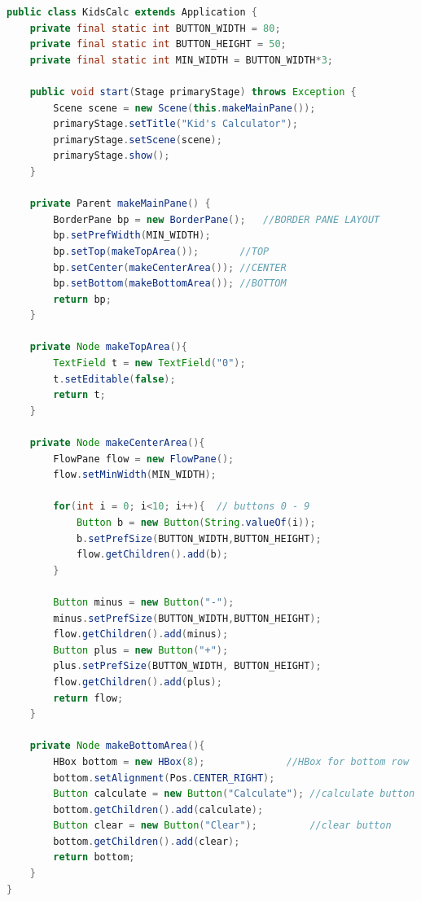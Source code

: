 \vspace{-60pt}
\begin{answer}
\begin{lstlisting}[language=java,basicstyle=\scriptsize]
public class KidsCalc extends Application {
    private final static int BUTTON_WIDTH = 80;
    private final static int BUTTON_HEIGHT = 50;
    private final static int MIN_WIDTH = BUTTON_WIDTH*3;

    public void start(Stage primaryStage) throws Exception {
        Scene scene = new Scene(this.makeMainPane());
        primaryStage.setTitle("Kid's Calculator");
        primaryStage.setScene(scene);
        primaryStage.show();
    }

    private Parent makeMainPane() {
        BorderPane bp = new BorderPane();	//BORDER PANE LAYOUT
        bp.setPrefWidth(MIN_WIDTH);
        bp.setTop(makeTopArea()); 		//TOP
        bp.setCenter(makeCenterArea());	//CENTER
        bp.setBottom(makeBottomArea());	//BOTTOM
        return bp;
    }

    private Node makeTopArea(){
        TextField t = new TextField("0");
        t.setEditable(false);
        return t;
    }

    private Node makeCenterArea(){
        FlowPane flow = new FlowPane();
        flow.setMinWidth(MIN_WIDTH);
        
        for(int i = 0; i<10; i++){	// buttons 0 - 9
            Button b = new Button(String.valueOf(i));
            b.setPrefSize(BUTTON_WIDTH,BUTTON_HEIGHT);
            flow.getChildren().add(b);
        }
        
        Button minus = new Button("-"); 
        minus.setPrefSize(BUTTON_WIDTH,BUTTON_HEIGHT);
        flow.getChildren().add(minus);
        Button plus = new Button("+");
        plus.setPrefSize(BUTTON_WIDTH, BUTTON_HEIGHT);
        flow.getChildren().add(plus);
        return flow;
    }

    private Node makeBottomArea(){
        HBox bottom = new HBox(8);				//HBox for bottom row
        bottom.setAlignment(Pos.CENTER_RIGHT);
        Button calculate = new Button("Calculate");	//calculate button
        bottom.getChildren().add(calculate);
        Button clear = new Button("Clear");			//clear button
        bottom.getChildren().add(clear);
        return bottom;
    }
}
\end{lstlisting}
\end{answer}
